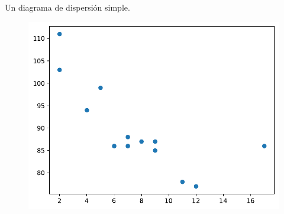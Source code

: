 \begin{code} Un diagrama de dispersión simple.

\begin{Shaded}
\begin{Highlighting}[]

\OperatorTok{=}\NormalTok{ np.array([}\NormalTok{,}\NormalTok{,}\NormalTok{,}\NormalTok{,}\NormalTok{,}\NormalTok{,}\NormalTok{,}\NormalTok{,}\NormalTok{,}\NormalTok{,}\NormalTok{,}\NormalTok{,}\NormalTok{])}
\OperatorTok{=}\NormalTok{ np.array([}\NormalTok{,}\NormalTok{,}\NormalTok{,}\NormalTok{,}\NormalTok{,}\NormalTok{,}\NormalTok{,}\NormalTok{,}\NormalTok{,}\NormalTok{,}\NormalTok{,}\NormalTok{,}\NormalTok{])}

\end{Highlighting}
\end{Shaded}

\begin{figure}
  \centering
  \includegraphics[scale=0.6]{img/grafica1036.pdf}
\end{figure}
\end{code}

